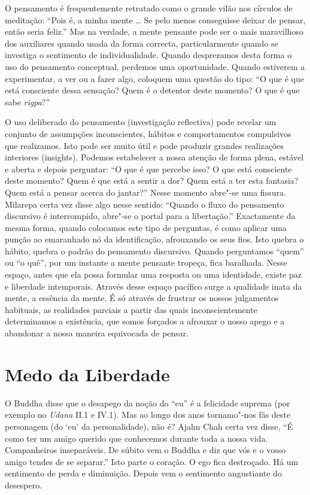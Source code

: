 O pensamento é frequentemente retratado como o grande vilão nos círculos
de meditação: ``Pois é, a minha mente \ldots{} Se pelo menos conseguisse
deixar de pensar, então seria feliz.'' Mas na verdade, a mente pensante
pode ser o mais maravilhoso dos auxiliares quando usada da forma
correcta, particularmente quando se investiga o sentimento de
individualidade. Quando desprezamos desta forma o uso do pensamento
conceptual, perdemos uma oportunidade. Quando estiverem a experimentar,
a ver ou a fazer algo, coloquem uma questão do tipo: ``O que é que está
consciente dessa sensação? Quem é o detentor deste momento? O que é que
sabe \emph{rigpa}?''

O uso deliberado do pensamento (investigação reflectiva) pode revelar um
conjunto de assumpções inconscientes, hábitos e comportamentos
compulsivos que realizamos. Isto pode ser muito útil e pode produzir
grandes realizações interiores (insights). Podemos estabelecer a nossa
atenção de forma plena, estável e aberta e depois perguntar: ``O que é
que percebe isso? O que está consciente deste momento? Quem é que está a
sentir a dor? Quem está a ter esta fantasia? Quem está a pensar acerca
do jantar?'' Nesse momento abre"-se uma fissura. Milarepa certa vez disse
algo nesse sentido: ``Quando o fluxo do pensamento discursivo é
interrompido, abre"-se o portal para a libertação.'' Exactamente da mesma
forma, quando colocamos este tipo de perguntas, é como aplicar uma
punção ao emaranhado nó da identificação, afrouxando os seus fios. Isto
quebra o hábito, quebra o padrão do pensamento discursivo. Quando
perguntamos ``quem'' ou ``o quê'', por um instante a mente pensante
tropeça, fica baralhada. Nesse espaço, antes que ela possa formular uma
resposta ou uma identidade, existe paz e liberdade intemporais. Através
desse espaço pacífico surge a qualidade inata da mente, a essência da
mente. É só através de frustrar os nossos julgamentos habituais, as
realidades parciais a partir das quais inconscientemente determinamos a
existência, que somos forçados a afrouxar o nosso apego e a abandonar a
nossa maneira equivocada de pensar.

\section{Medo da Liberdade}

O Buddha disse que o desapego da noção do ``eu'' é a felicidade suprema
(por exemplo no \emph{Udana} II.1 e IV.1). Mas ao longo dos anos
tornamo"-nos fãs deste personagem (do `eu' da personalidade), não é?
Ajahn Chah certa vez disse, ``É como ter um amigo querido que conhecemos
durante toda a nossa vida. Companheiros inseparáveis. De súbito vem o
Buddha e diz que vós e o vosso amigo tendes de se separar.'' Isto parte
o coração. O ego fica destroçado. Há um sentimento de perda e
diminuição. Depois vem o sentimento angustiante do desespero.

